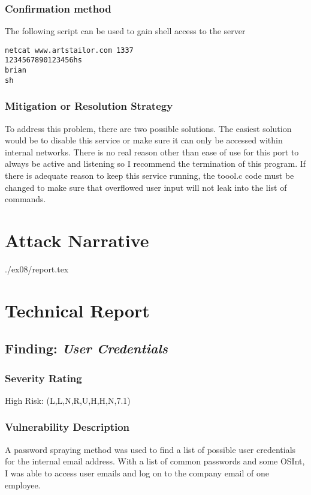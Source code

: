   	\subsubsection*{Confirmation method}
  	    The following script can be used to gain shell access to the server
    \begin{verbatim}
netcat www.artstailor.com 1337
1234567890123456hs
brian
sh
    \end{verbatim}
				
    \subsubsection*{Mitigation or Resolution Strategy}
    To address this problem, there are two possible solutions. The easiest solution would be to disable this service or make sure it can only be accessed
    within internal networks. There is no real reason other than ease of use for this port to always be active and listening so I recommend the termination of
    this program. If there is adequate reason to keep this service running, the toool.c code must be changed to make sure that overflowed user input will not
    leak into the list of commands.



\section{Attack Narrative}
./ex08/report.tex

\section{Technical Report}

  \subsection{Finding: \emph{User Credentials}}
  
	\subsubsection*{Severity Rating}
	    High Risk:	    
		\cvss(L,L,N,R,U,H,H,N,7.1)
		
  	\subsubsection*{Vulnerability Description}
  		A password spraying method was used to find a list of possible user credentials for the internal email address. With a list of
        common passwords and some OSInt, I was able to access user emails and log on to the company email of one employee.

